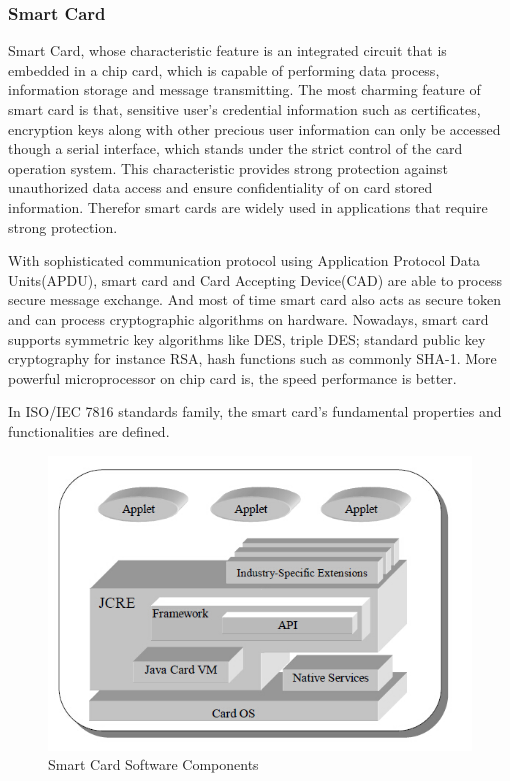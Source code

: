 \documentclass[]{llncs}
\begin{document}
\subsubsection{Smart Card}
Smart Card, whose characteristic feature is an integrated circuit that is embedded in a chip card, which is capable of performing data process, information storage and message transmitting\cite{handbuch}. The most charming feature of smart card is that, sensitive user's credential information such as certificates, encryption keys along with other precious user information can only be accessed though a serial interface, which stands under the strict control of the card operation system. This characteristic provides strong  protection against  unauthorized data access and ensure confidentiality of on card stored information. Therefor smart cards are widely used in applications that require strong protection.

With sophisticated communication protocol using Application Protocol Data Units(APDU), smart card and Card Accepting Device(CAD) are able to process secure message exchange. And most of time smart card also acts as secure token and can process cryptographic algorithms on hardware. Nowadays, smart card supports symmetric key algorithms like DES, triple DES; standard public key cryptography for instance RSA, hash functions such as commonly SHA-1\cite{handbuch}. More powerful microprocessor on chip card is, the speed performance is better.  

In ISO/IEC 7816 standards family,  the smart card's fundamental properties and functionalities are defined.



\begin{figure}[!htbp]
	\centering
	\includegraphics[width=1.2\textwidth]{scc.jpg}
		\caption[ ]{Smart Card Software Components\cite{jcadg}}
	\label{fig:scc}
\end{figure}
\end{document}
